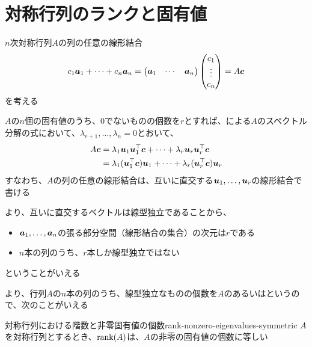 \documentclass[../../../topic_linear-algebra]{subfiles}
\begin{document}
\sectionline
\section{対称行列のランクと固有値}

$n$次対称行列$A$の列の任意の線形結合
\begin{equation*}
  c_1\vb*{a}_1 + \cdots + c_n\vb*{a}_n = \begin{pmatrix}
    \vb*{a}_1 & \cdots & \vb*{a}_n
  \end{pmatrix} \begin{pmatrix}
    c_1    \\
    \vdots \\
    c_n
  \end{pmatrix} = A\vb*{c}
\end{equation*}
を考える

\br

$A$の$n$個の固有値のうち、0でないものの個数を$r$とすれば、による$A$のスペクトル分解の式において、$\lambda_{r+1}, \ldots, \lambda_n = 0$とおいて、
\begin{align*}
  A\vb*{c} & = \lambda_1\vb*{u}_1\vb*{u}_1^\top\vb*{c} + \cdots + \lambda_r\vb*{u}_r\vb*{u}_r^\top\vb*{c}     \\
           & = \lambda_1(\vb*{u}_1^\top\vb*{c})\vb*{u}_1 + \cdots + \lambda_r(\vb*{u}_r^\top\vb*{c})\vb*{u}_r
\end{align*}
すなわち、$A$の列の任意の線形結合は、互いに直交する$\vb*{u}_1, \ldots, \vb*{u}_r$の線形結合で書ける

\br

より、互いに直交するベクトルは線型独立であることから、
\begin{itemize}
  \item $\vb*{a}_1, \ldots, \vb*{a}_n$の張る部分空間（線形結合の集合）の次元は$r$である
  \item $n$本の列のうち、$r$本しか線型独立ではない
\end{itemize}
ということがいえる

\br

より、行列$A$の$n$本の列のうち、線型独立なものの個数を$A$のあるいはというので、次のことがいえる

\begin{theorem}{対称行列における階数と非零固有値の個数}{rank-nonzero-eigenvalues-symmetric}
  $A$を対称行列とするとき、$\rank(A)$は、$A$の非零の固有値の個数に等しい
\end{theorem}
\end{document}
